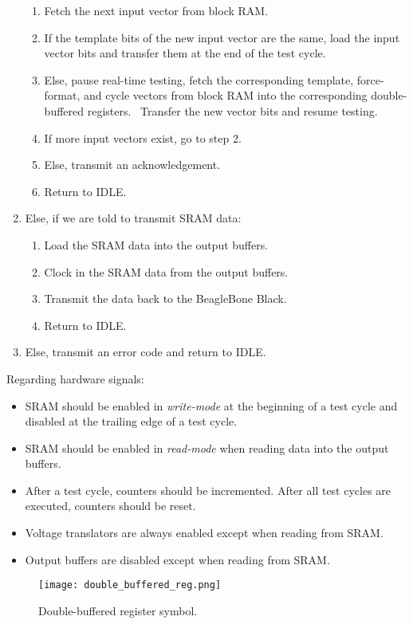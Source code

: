 \begin{enumerate}
\begin{enumerate}[label=\arabic*.]
    \item Fetch the next input vector from block RAM. 
    \item If the template bits of the new input vector are the same, load the input vector bits and transfer them at the end of the test cycle.
    \item Else, pause real-time testing, fetch the corresponding template, force-format, and cycle vectors from block RAM into the corresponding double-buffered registers.
    \ Transfer the new vector bits and resume testing.
    \item If more input vectors exist, go to step 2.
    \item Else, transmit an acknowledgement.
    \item Return to IDLE.
  \end{enumerate}
\item Else, if we are told to transmit SRAM data: 
  \begin{enumerate}[label=\arabic*.]
    \item Load the SRAM data into the output buffers.
    \item Clock in the SRAM data from the output buffers.
    \item Transmit the data back to the BeagleBone Black.
    \item Return to IDLE.
  \end{enumerate}
  \item Else, transmit an error code and return to IDLE.
\end{enumerate}

Regarding hardware signals: 
\begin{itemize}
	\item SRAM should be enabled in \textit{write-mode} at the beginning of a test cycle and disabled at the trailing edge of a test cycle.
	\item SRAM should be enabled in \textit{read-mode} when reading data into the output buffers.
	\item After a test cycle, counters should be incremented. After all test cycles are executed, counters should be reset.
	\item Voltage translators are always enabled except when reading from SRAM.
	\item Output buffers are disabled except when reading from SRAM.
\end{itemize}

\begin{figure}
\texttt{[image: double\_buffered\_reg.png]}
\caption{Double-buffered register symbol.}
\label{fig:double_buf_reg}
\end{figure}

